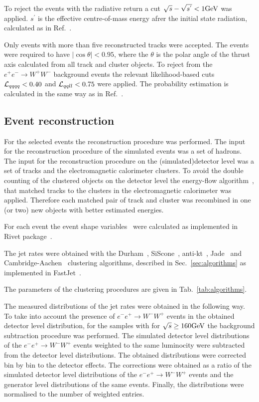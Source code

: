 To reject the events with  the radiative return a cut $\sqrt{s}-\sqrt{s^{'}}<1{\text{Ge}\kern-0.06667em\text{V\/}}$ was applied. 
${s}^{'}$ is the effective centre-of-mass energy afrer the initial state radiation, calculated as in Ref.~\cite{Abbiendi:2003dh}.

Only events with more than five reconstructed tracks were accepted.
The events were required to have $|\cos\theta|<0.95$, where the  
$\theta$ is the polar angle of the thrust axis calculated from all track
and cluster objects.
To reject from the $e^+e^-\rightarrow W^+W^-$ background events the relevant likelihood-based cuts ${\cal L}_{qqqq}<0.40$ and 
${\cal L}_{qqll}<0.75$ were applied.
The probability estimation is  calculated in the same way as in Ref.~\cite{Abbiendi:2000eg}.

\subsection{Event reconstruction}
\label{sec:reconstruction}
For the selected events the reconstruction procedure was performed.
The input for the reconstruction procedure of  the simulated events
was a set of hadrons.
The input for the reconstruction procedure on the (simulated)detector level
 was a set of tracks and the electromagnetic calorimeter clusters.
To avoid the double counting of the clustered objects on the detector level the energy-flow 
algorithm~\cite{Ackerstaff:1997nga,Abbiendi:1999sy}, that matched tracks to the 
 clusters in the electromagnetic calorimeter was applied. Therefore  each 
 matched pair of track and cluster  was recombined in one (or two) new objects with better estimated energies.

For each event the event shape variables~\cite{OPAL:2011aa} 
were calculated  as  implemented in Rivet package~\cite{Buckley:2010ar}.

The jet rates were obtained with the Durham~\cite{Catani:1991hj}, SiScone~\cite{Cacciari:2005hq}, anti-kt~\cite{Cacciari:2008gp}, Jade~\cite{Bartel:1986ua}
  and Cambridge-Aachen~\cite{Dokshitzer:1997in}
clustering algorithms, described in Sec.~\ref{sec:algorithms} as implemented in FastJet~\cite{Cacciari:2011ma}.

The parameters of the clustering procedures are given in Tab.~\ref{tab:algorithms}.
\TABalgorithms

The measured distributions of the jet rates were obtained in the following way.
To take into account the presence of $e^-e^+ \rightarrow W^-W^+$ events in the 
obtained detector level distribution, for the samples with for $\sqrt{s}\ge 160{\text{Ge}\kern-0.06667em\text{V\/}}$ the background subtraction procedure was performed. 
The simulated detector level distributions of the $e^-e^+ \rightarrow W^-W^+$ events 
weighted to the same luminocity were subtracted from the detector level distributions.
The obtained distributions were corrected bin by bin to the detector effects. 
The corrections were obtained as a ratio of 
the simulated detector level distributions of the $e^-e^+ \rightarrow W^-W^+$ events 
and the generator level distributions of the same events.
Finally, the  distributions were normalised to the number of weighted entries.

